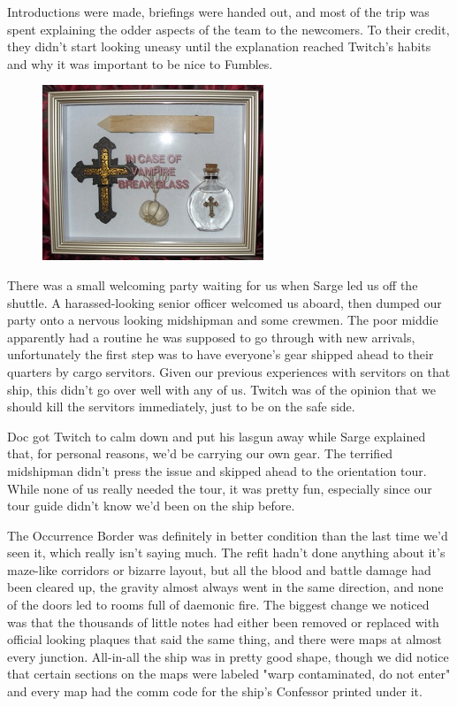 Introductions were made, briefings were handed out, and most of the trip was spent explaining the odder aspects of the team to the newcomers. 
To their credit, they didn't start looking uneasy until the explanation reached Twitch's habits and why it was important to be nice to Fumbles.

\begin{figure}
	\begin{center}
		\includegraphics[width=\figwidth]{pics/10/5.png}
	\end{center}
\end{figure}
There was a small welcoming party waiting for us when Sarge led us off the shuttle. 
A harassed-looking senior officer welcomed us aboard, then dumped our party onto a nervous looking midshipman and some crewmen. 
The poor middie apparently had a routine he was supposed to go through with new arrivals, unfortunately the first step was to have everyone's gear shipped ahead to their quarters by cargo servitors. 
Given our previous experiences with servitors on that ship, this didn't go over well with any of us. 
Twitch was of the opinion that we should kill the servitors immediately, just to be on the safe side.

Doc got Twitch to calm down and put his lasgun away while Sarge explained that, for personal reasons, we'd be carrying our own gear. 
The terrified midshipman didn't press the issue and skipped ahead to the orientation tour. 
While none of us really needed the tour, it was pretty fun, especially since our tour guide didn't know we'd been on the ship before.

The Occurrence Border was definitely in better condition than the last time we'd seen it, which really isn't saying much. 
The refit hadn't done anything about it's maze-like corridors or bizarre layout, but all the blood and battle damage had been cleared up, the gravity almost always went in the same direction, and none of the doors led to rooms full of daemonic fire. 
The biggest change we noticed was that the thousands of little notes had either been removed or replaced with official looking plaques that said the same thing, and there were maps at almost every junction. 
All-in-all the ship was in pretty good shape, though we did notice that certain sections on the maps were labeled "warp contaminated, do not enter" and every map had the comm code for the ship's Confessor printed under it.

